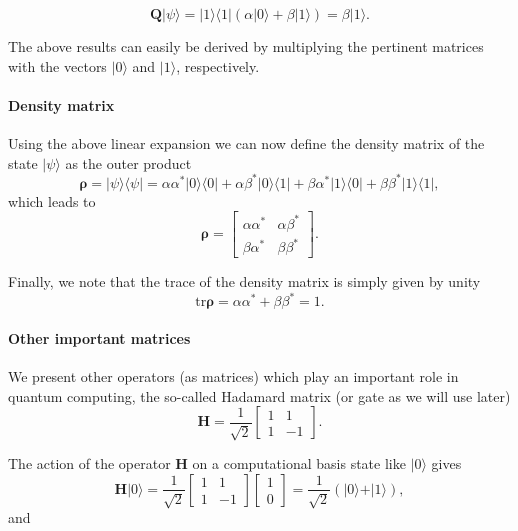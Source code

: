 \[
\bm{Q}\vert \psi \rangle = \vert 1 \rangle\langle 1\vert (\alpha \vert 0 \rangle + \beta\vert 1 \rangle)=\beta \vert 1\rangle.
\]

The above results can easily be derived by multiplying the pertinent
matrices with the vectors $\vert 0\rangle$ and $\vert 1\rangle$,
respectively.


\paragraph{Density matrix}

Using the above linear expansion we can now define the density matrix of the state $\vert \psi\rangle$ as the outer product
\[
\bm{\rho}=\vert \psi \rangle\langle \psi \vert = \alpha\alpha^* \vert 0 \rangle\langle 0\vert+\alpha\beta^* \vert 0 \rangle\langle 1\vert+\beta\alpha^* \vert 1 \rangle\langle 0\vert+\beta\beta^* \vert 1 \rangle\langle 1\vert,
\]
which leads to
\[
\bm{\rho}=\begin{bmatrix} \alpha\alpha^* & \alpha\beta^*\\ \beta\alpha^* & \beta\beta^*\end{bmatrix}.
\]

Finally, we note that the trace of the density matrix is simply given by unity
\[
\mathrm{tr}\bm{\rho}=\alpha\alpha^* +\beta\beta^*=1.
\]


\paragraph{Other important matrices}

We present other operators (as matrices) which play an important role in quantum computing, the so-called Hadamard matrix (or gate as we will use later)
\[
\bm{H}=\frac{1}{\sqrt{2}}\begin{bmatrix} 1 & 1 \\ 1 & -1\end{bmatrix}.
\]

The action of the operator $\bm{H}$ on a computational basis state like $\vert 0\rangle$ gives
\[
\bm{H}\vert 0 \rangle = \frac{1}{\sqrt{2}}\begin{bmatrix} 1 & 1 \\ 1 & -1\end{bmatrix}\begin{bmatrix} 1 \\ 0\end{bmatrix}=\frac{1}{\sqrt{2}}(\vert 0\rangle + \vert 1\rangle),
\]
and 

